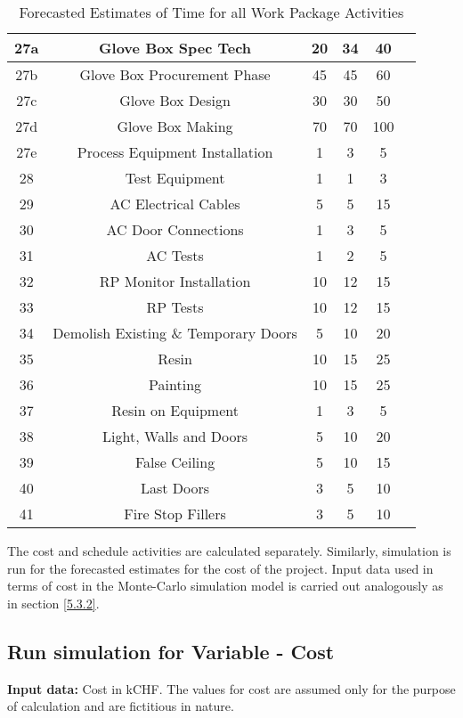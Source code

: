 \begin{table}[ht]
\begin{center}
\begin{tabular}{ |c|c|c|c|c| c|}
		\hline
		27a&Glove Box Spec Tech &20&34&40\\
		\hline
		27b&Glove Box Procurement Phase&45&45&60\\
		\hline
		27c&Glove Box Design&30&30&50\\
		\hline
		27d&Glove Box Making&70&70&100\\
		\hline
		27e&Process Equipment Installation&1&3&5\\
		\hline
		28&Test Equipment&1&1&3\\
		\hline
		29&AC Electrical Cables&5&5&15\\
		\hline
		30&AC Door Connections&1&3&5\\
		\hline
		31&AC Tests&1&2&5\\
		\hline
		32&RP Monitor Installation&10&12&15\\
		\hline
		33&RP Tests&10&12&15\\
		\hline
		34&Demolish Existing \& Temporary Doors&5&10&20\\
		\hline
		35&Resin&10&15&25\\
		\hline
		36&Painting&10&15&25\\
		\hline
		37&Resin on Equipment&1&3&5\\
		\hline
		38&Light, Walls and Doors&5&10&20\\
		\hline
		39&False Ceiling&5&10&15\\
		\hline
		40&Last Doors&3&5&10\\
		\hline
		41&Fire Stop Fillers&3&5&10\\
		\hline
	\end{tabular}
\end{center}

	\caption[Forecasted Estimates of Time for all Work Package Activities]{Forecasted Estimates of Time for all Work Package Activities}
\label{tab:caption5}
\end{table}%


The cost and schedule activities are calculated separately. Similarly, simulation is run for the forecasted estimates for the cost of the project. Input data used in terms of cost in the Monte-Carlo simulation model is carried out analogously as in section \ref{5.3.2}.  


\subsection{Run simulation for Variable - Cost}

\textbf{Input data:} Cost in kCHF. The values for cost are assumed only for the purpose of calculation and are fictitious in nature.


